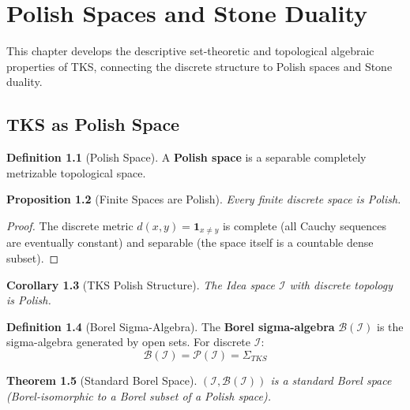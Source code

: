 \documentclass[11pt,twoside,openright]{book}
\theoremstyle{definition}
\newtheorem{definition}{Definition}[chapter]
\theoremstyle{plain}
\newtheorem{theorem}[definition]{Theorem}
\newtheorem{proposition}[definition]{Proposition}
\newtheorem{corollary}[definition]{Corollary}
\theoremstyle{remark}
\newcommand{\Ideas}{\mathcal{I}}
\newcommand{\SigAlg}{\Sigma}                 %
\newcommand{\Bor}{\mathcal{B}}               %
\newcommand{\vnewtwo}{\textbf{v7.2 New}}
\begin{document}
\chapter{Polish Spaces and Stone Duality}
\label{ch:polish-stone}

\begin{tcolorbox}[colback=blue!5!white,colframe=blue!75!black,title=\vnewtwo]
This chapter develops the descriptive set-theoretic and topological algebraic properties of TKS, connecting the discrete structure to Polish spaces and Stone duality.
\end{tcolorbox}

\section{TKS as Polish Space}

\begin{definition}[Polish Space]
\label{def:polish-space}
A \textbf{Polish space} is a separable completely metrizable topological space.
\end{definition}

\begin{proposition}[Finite Spaces are Polish]
\label{prop:finite-polish}
Every finite discrete space is Polish.
\end{proposition}

\begin{proof}
The discrete metric $d(x, y) = \mathbf{1}_{x \neq y}$ is complete (all Cauchy sequences are eventually constant) and separable (the space itself is a countable dense subset).
\end{proof}

\begin{corollary}[TKS Polish Structure]
\label{cor:tks-polish}
The Idea space $\Ideas$ with discrete topology is Polish.
\end{corollary}

\begin{definition}[Borel Sigma-Algebra]
\label{def:borel-algebra}
The \textbf{Borel sigma-algebra} $\Bor(\Ideas)$ is the sigma-algebra generated by open sets. For discrete $\Ideas$:
\[
\Bor(\Ideas) = \mathcal{P}(\Ideas) = \SigAlg_{TKS}
\]
\end{definition}

\begin{theorem}[Standard Borel Space]
\label{thm:standard-borel}
$(\Ideas, \Bor(\Ideas))$ is a standard Borel space (Borel-isomorphic to a Borel subset of a Polish space).
\end{theorem}
\end{document}
